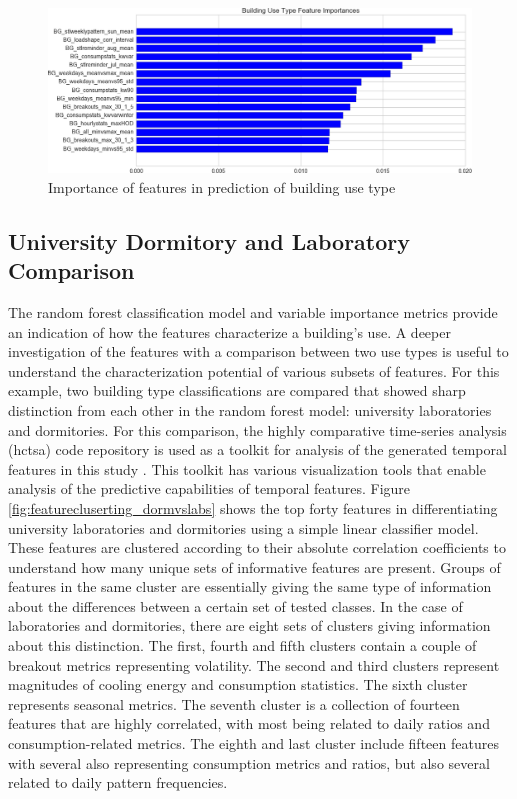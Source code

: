 \begin{figure}[ht!]
\begin{center}
\includegraphics[width=1\columnwidth]{figures/FeatureImportanceBuildingUseType1/FeatureImportanceBuildingUseType1}
\caption{{Importance of features in prediction of building use type
\label{sec:featureimportance_usetype}%
}}
\end{center}
\end{figure}

\subsection{University Dormitory and Laboratory Comparison}
\label{sec:dormvslab}

The random forest classification model and variable importance metrics provide an indication of how the features characterize a building's use. A deeper investigation of the features with a comparison between two use types is useful to understand the characterization potential of various subsets of features. For this example, two building type classifications are compared that showed sharp distinction from each other in the random forest model: university laboratories and dormitories. For this comparison, the highly comparative time-series analysis (hctsa) code repository is used as a toolkit for analysis of the generated temporal features in this study \cite{Fulcher_2013}. This toolkit has various visualization tools that enable analysis of the predictive capabilities of temporal features. Figure \ref{fig:featurecluserting_dormvslabs} shows the top forty features in differentiating university laboratories and dormitories using a simple linear classifier model. These features are clustered according to their absolute correlation coefficients to understand how many unique sets of informative features are present. Groups of features in the same cluster are essentially giving the same type of information about the differences between a certain set of tested classes. In the case of laboratories and dormitories, there are eight sets of clusters giving information about this distinction. The first, fourth and fifth clusters contain a couple of breakout metrics representing volatility. The second and third clusters represent magnitudes of cooling energy and consumption statistics. The sixth cluster represents seasonal metrics. The seventh cluster is a collection of fourteen features that are highly correlated, with most being related to daily ratios and consumption-related metrics. The eighth and last cluster include fifteen features with several also representing consumption metrics and ratios, but also several related to daily pattern frequencies.

